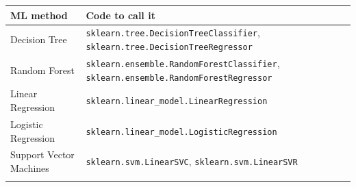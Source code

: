 \documentclass[
  letterpaper,
]{scrbook}
\begin{document}
\begin{longtable}[]{@{}ll@{}}
\toprule
\begin{minipage}[b]{0.26\columnwidth}\raggedright
ML method\strut
\end{minipage} & \begin{minipage}[b]{0.68\columnwidth}\raggedright
Code to call it\strut
\end{minipage}\tabularnewline
\midrule
\endhead
\begin{minipage}[t]{0.26\columnwidth}\raggedright
Decision Tree\strut
\end{minipage} & \begin{minipage}[t]{0.68\columnwidth}\raggedright
\texttt{sklearn.tree.DecisionTreeClassifier}, \texttt{sklearn.tree.DecisionTreeRegressor}\strut
\end{minipage}\tabularnewline
\begin{minipage}[t]{0.26\columnwidth}\raggedright
Random Forest\strut
\end{minipage} & \begin{minipage}[t]{0.68\columnwidth}\raggedright
\texttt{sklearn.ensemble.RandomForestClassifier}, \texttt{sklearn.ensemble.RandomForestRegressor}\strut
\end{minipage}\tabularnewline
\begin{minipage}[t]{0.26\columnwidth}\raggedright
Linear Regression\strut
\end{minipage} & \begin{minipage}[t]{0.68\columnwidth}\raggedright
\texttt{sklearn.linear\_model.LinearRegression}\strut
\end{minipage}\tabularnewline
\begin{minipage}[t]{0.26\columnwidth}\raggedright
Logistic Regression\strut
\end{minipage} & \begin{minipage}[t]{0.68\columnwidth}\raggedright
\texttt{sklearn.linear\_model.LogisticRegression}\strut
\end{minipage}\tabularnewline
\begin{minipage}[t]{0.26\columnwidth}\raggedright
Support Vector Machines\strut
\end{minipage} & \begin{minipage}[t]{0.68\columnwidth}\raggedright
\texttt{sklearn.svm.LinearSVC}, \texttt{sklearn.svm.LinearSVR}\strut
\end{minipage}\tabularnewline
\begin{minipage}[t]{0.26\columnwidth}\raggedright
\strut
\end{minipage} & \begin{minipage}[t]{0.68\columnwidth}\raggedright
\strut
\end{minipage}\tabularnewline
\bottomrule
\end{longtable}
\end{document}
